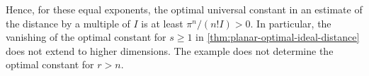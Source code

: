 Hence, for these equal exponents, the optimal universal constant in an estimate of the distance by a multiple of $I$ is at least $\pi^n/(n!I)>0$. In particular, the vanishing of the optimal constant for $s\geq1$ in \cref{thm:planar-optimal-ideal-distance} does not extend to higher dimensions. The example does not determine the optimal constant for $r>n$.
